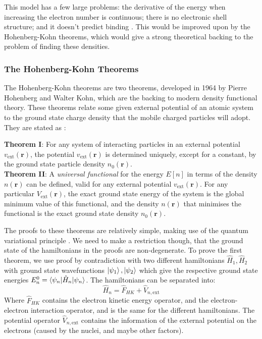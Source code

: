 \documentclass[12pt]{article}
\begin{document}
This model has a few large problems: the derivative of the energy when increasing the electron number is continuous; there is no electronic shell structure; and it doesn't predict binding \cite{lieb1977thomas}. This would be improved upon by the Hohenberg-Kohn theorems, which would give a strong theoretical backing to the problem of finding these densities.

\subsubsection{The Hohenberg-Kohn Theorems}
The Hohenberg-Kohn theorems \cite{PhysRev.136.B864} are two theorems, developed in 1964 by Pierre Hohenberg and Walter Kohn, which are the backing to modern density functional theory. These theorems relate some given external potential of an atomic system to the ground state charge density that the mobile charged particles will adopt. They are stated as \cite{martin_2004}:
\begin{displayquote}
	\textbf{Theorem I}: For any system of interacting particles in an external potential $v_\mathrm{ext}(\mathbf r)$, the potential $v_\mathrm{ext}(\mathbf r)$ is determined uniquely, except for a constant, by the ground state particle density $n_0(\mathbf{r})$.
\\
	\textbf{Theorem II}: A \textit{universal functional} for the energy $E[n]$ in terms of the density $n(\mathbf r)$ can be defined, valid for any external potential $v_\mathrm{ext}(\mathbf r)$.
For any particular $V_\mathrm{ext}(\mathbf r)$, the exact ground state energy of the system is the global minimum value of this functional, and the density $n(\mathbf r)$ that minimises the functional is the exact ground state density $n_0(\mathbf r)$.
\end{displayquote}
The proofs to these theorems are relatively simple, making use of the quantum variational principle \cite{shankar2012principles}. We need to make a restriction though, that the ground state of the hamiltonians in the proofs are non-degenerate.
To prove the first theorem, we use proof by contradiction with two different hamiltonians $\hat H_1, \hat H_2$ with ground state wavefunctions $\ket{\psi_1}, \ket{\psi_2}$ which give the respective ground state energies $E^0_n=\braket{\psi_n | \hat H_n | \psi_n}$. 
The hamiltonians can be separated into:
\begin{equation}
\hat H_n = \hat F_{HK} + \hat V_{n, \mathrm{ext}}
\end{equation}
Where $\hat F_{HK}$ contains the electron kinetic energy operator, and the electron-electron interaction operator, and is the same for the different hamiltonians. The potential operator $\hat V_{n, \mathrm{ext}}$ contains the information of the external potential on the electrons (caused by the nuclei, and maybe other factors).
\end{document}
